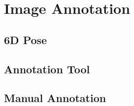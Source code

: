 \chapter{Image Annotation} \label{chapter:data_annotation}

\section{6D Pose}

\section{Annotation Tool}

\section{Manual Annotation}
